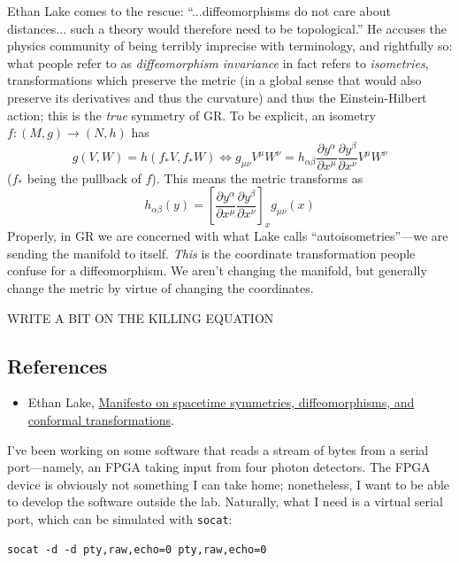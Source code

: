 \documentclass{report}
\begin{document}
Ethan Lake comes to the rescue: ``...diffeomorphisms do not care about distances... 
such a theory would therefore need to be topological.'' He accuses the physics 
community of being terribly imprecise with terminology, and rightfully so:
what people refer to as \textit{diffeomorphism invariance} in fact refers to 
\textit{isometries}, transformations which preserve the metric (in a global 
sense that would also preserve its derivatives and thus the curvature) and thus 
the Einstein-Hilbert action; this is the \textit{true} symmetry of GR. To 
be explicit, an isometry $ f: (M,g) \to (N, h) $ has 
\begin{equation*}
	g(V,W) = h(f_\ast V, f_\ast W) 
	\iff 
	g_{\mu\nu} V^\mu W^\nu
		= h_{\alpha\beta} \frac{\partial y^{\alpha}}{\partial x^\mu}
			\frac{\partial y^\beta}{\partial x^\nu} V^\mu W^\nu
\end{equation*}
($ f_\ast $ being the pullback of $ f $). This means the metric transforms as 
\begin{equation*}
	h_{\alpha\beta}(y) = \left[ \frac{\partial y^{\alpha}}{\partial x^\mu}
			\frac{\partial y^\beta}{\partial x^\nu}\right]_{x} g_{\mu\nu}(x)
\end{equation*}
Properly, in GR we are concerned with what Lake calls ``autoisometries''---we 
are sending the manifold to itself. \textit{This} is the coordinate transformation 
people confuse for a diffeomorphism. We aren't changing the manifold, but 
generally change the metric by virtue of changing the coordinates.

WRITE A BIT ON THE KILLING EQUATION

\subsection*{References}
\begin{itemize}[nosep]
\item Ethan Lake,
\href{https://drive.google.com/file/d/1_w_JyW0Fppm94RNzSLckHALEUQ5xUHBH/view}{Manifesto
on spacetime symmetries, diffeomorphisms, and conformal transformations}.
\end{itemize}

I've been working on some software that reads a stream of bytes from a serial 
port---namely, an FPGA taking input from four photon detectors. The FPGA device 
is obviously not something I can take home; nonetheless, I want to be able to 
develop the software outside the lab. Naturally, what I need is a virtual serial port, 
which can be simulated with \texttt{socat}:
\begin{verbatim}
socat -d -d pty,raw,echo=0 pty,raw,echo=0
\end{verbatim}
\end{document}
